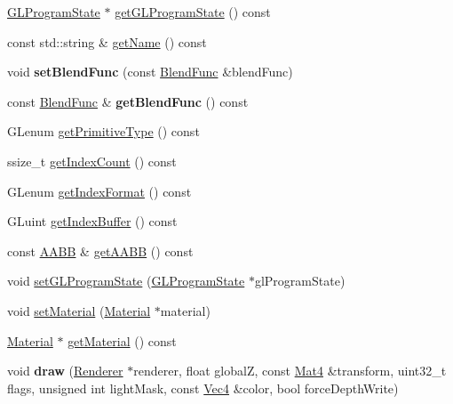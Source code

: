 \begin{DoxyCompactItemize}
\item 
\hyperlink{classGLProgramState}{G\+L\+Program\+State} $\ast$ \hyperlink{classMesh_ae522c9730cd764069561f1ce2e15f587}{get\+G\+L\+Program\+State} () const
\item 
const std\+::string \& \hyperlink{classMesh_a87a6913ba3a4220a77c011ca7f75045d}{get\+Name} () const
\item 
\mbox{\label{classMesh_ac339d2e0c82b8004b8a46aee48728c75}} 
void {\bfseries set\+Blend\+Func} (const \hyperlink{structBlendFunc}{Blend\+Func} \&blend\+Func)
\item 
\mbox{\label{classMesh_ae8ae3367f46223c4beb0bf8918043613}} 
const \hyperlink{structBlendFunc}{Blend\+Func} \& {\bfseries get\+Blend\+Func} () const
\item 
G\+Lenum \hyperlink{classMesh_a1b3969fa1a815cafb840cb7ab8a83ad7}{get\+Primitive\+Type} () const
\item 
ssize\+\_\+t \hyperlink{classMesh_a7ae6ed2eb06a5cbf4f3154b7fa668a4d}{get\+Index\+Count} () const
\item 
G\+Lenum \hyperlink{classMesh_a1d23b78ab2e51b134ae79acd2754f45c}{get\+Index\+Format} () const
\item 
G\+Luint \hyperlink{classMesh_a2b30616b2101f88ffdbef2720538f9d6}{get\+Index\+Buffer} () const
\item 
const \hyperlink{classAABB}{A\+A\+BB} \& \hyperlink{classMesh_a62a70c82c57dabc8c728756df13c805d}{get\+A\+A\+BB} () const
\item 
void \hyperlink{classMesh_a0ed181ab96758bfef2c6836aad2d8f8c}{set\+G\+L\+Program\+State} (\hyperlink{classGLProgramState}{G\+L\+Program\+State} $\ast$gl\+Program\+State)
\item 
void \hyperlink{classMesh_acee71afee77988e9233bee788ac501f3}{set\+Material} (\hyperlink{classMaterial}{Material} $\ast$material)
\item 
\hyperlink{classMaterial}{Material} $\ast$ \hyperlink{classMesh_ad0815fc310ab9de09381978871f2bc77}{get\+Material} () const
\item 
\mbox{\label{classMesh_aac6b32ceb472188570a5fdfabdc84467}} 
void {\bfseries draw} (\hyperlink{classRenderer}{Renderer} $\ast$renderer, float globalZ, const \hyperlink{classMat4}{Mat4} \&transform, uint32\+\_\+t flags, unsigned int light\+Mask, const \hyperlink{classVec4}{Vec4} \&color, bool force\+Depth\+Write)
\item 

\end{DoxyCompactItemize}
